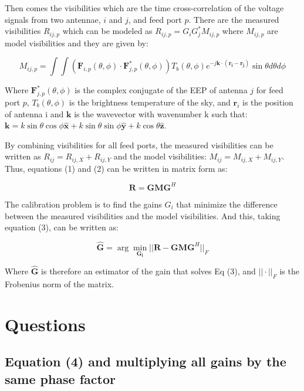 \documentclass[12pt]{report} %
\begin{document}
Then comes the visibilities which are the time cross-correlation of the voltage signals from two antennae, $i$ and $j$, and feed port $p$\cite{smirnov2011revisiting}. There are the measured visibilities $R_{ij,p}$ which can be modeled as $R_{ij,p} = G_{i}G^{*}_{j}M_{ij,p}$ where $M_{ij,p}$ are model visibilities and they are given by:

\begin{equation}
    M_{ij,p} = \int\int (\mathbf{F}_{i,p}(\theta, \phi) \cdot \mathbf{F}_{j,p}^{*}(\theta, \phi))T_{b}(\theta, \phi)e^{-j\mathbf{k} \cdot (\mathbf{r_{i}}-\mathbf{r_{j}})} \sin\theta d\theta d\phi
\end{equation}

Where $\mathbf{F}_{j,p}^{*}(\theta, \phi)$ is the complex conjugate of the EEP of antenna $j$ for feed port $p$, $T_{b}(\theta, \phi)$ is the brightness temperature of the sky, and $\mathbf{r}_{i}$ is the position of antenna i and $\mathbf{k}$ is the wavevector with wavenumber k such that: $\mathbf{k} = k \sin \theta \cos \phi \mathbf{\hat{x}} + k \sin \theta \sin \phi \mathbf{\hat{y}} + k \cos \theta \mathbf{\hat{z}}$.

By combining visibilities for all feed ports, the measured visibilities can be written as $R_{ij} = R_{ij, X} + R_{ij, Y}$ and the model visibilities: $M_{ij} = M_{ij, X} + M_{ij, Y}$. Thus, equations (1) and (2) can be written in matrix form as:

\begin{equation}
    \mathbf{R} = \mathbf{G} \mathbf{M} \mathbf{G}^H
\end{equation}

The calibration problem is to find the gains $G_{i}$ that minimize the difference between the measured visibilities and the model visibilities. And this, taking equation (3), can be written as:

\begin{equation}
    \mathbf{\hat{G}} = \arg\min_{\mathbf{G_{i}}} ||\mathbf{R} - \mathbf{G} \mathbf{M} \mathbf{G}^H||_{F}
\end{equation}

Where $\mathbf{\hat{G}}$ is therefore an estimator of the gain that solves Eq (3), and $||\cdot||_{F}$ is the Frobenius norm of the matrix.

\chapter{Questions}

\section{Equation (4) and multiplying all gains by the same phase factor}
\end{document}
